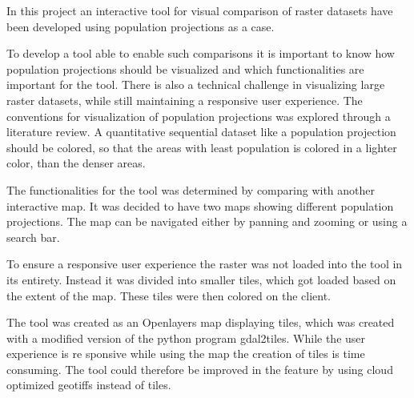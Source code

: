 

In this project an interactive tool for visual comparison of raster datasets have been developed using population projections as a case. 

To develop a tool able to enable such comparisons it is important to know how population projections should be visualized and which functionalities are important for the tool. There is also a technical challenge in visualizing large raster datasets, while still maintaining a responsive user experience.
The conventions for visualization of population projections was explored through a literature review. A quantitative sequential dataset like a population projection should be colored, so that the areas with least population is colored in a lighter color, than the denser areas. 

The functionalities for the tool was determined by comparing with another interactive map. It was decided to have two maps showing different population projections. The map can be navigated either by panning and zooming or using a search bar. 

To ensure a responsive user experience the raster was not loaded into the tool in its entirety. Instead it was divided into smaller tiles, which got loaded based on the extent of the map. These tiles were then colored on the client.

The tool was created as an Openlayers map displaying tiles, which was created with a modified version of the python program gdal2tiles.
While the user experience is re
sponsive while using the map the creation of tiles is time consuming. The tool could therefore be improved in the feature by using cloud optimized geotiffs instead of tiles.
